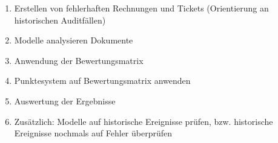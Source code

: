 

\begin{enumerate}
    \item Erstellen von fehlerhaften Rechnungen und Tickets (Orientierung an historischen Auditfällen)
    \item Modelle analysieren Dokumente
    \item Anwendung der Bewertungsmatrix
    \item Punktesystem auf Bewertungsmatrix anwenden
    \item Auswertung der Ergebnisse
    \item Zusätzlich: Modelle auf historische Ereignisse prüfen, bzw. historische Ereignisse nochmals auf Fehler überprüfen

\end{enumerate}
